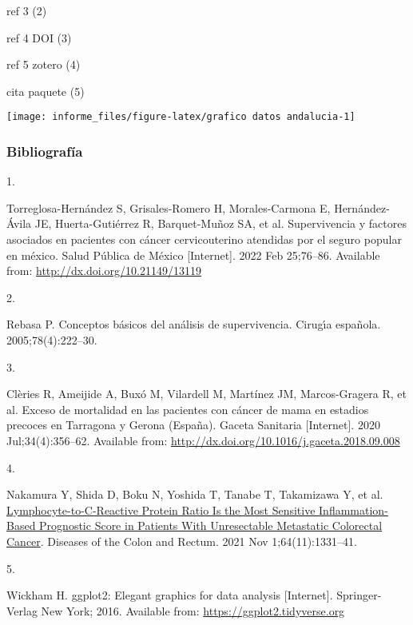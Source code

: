 \documentclass[
]{article}
\newlength{\cslhangindent}
\newlength{\csllabelwidth}
\newlength{\cslentryspacingunit} %
\newenvironment{CSLReferences}[2] %
 {%
  \setlength{\parindent}{0pt}
  \ifodd #1
  \let\oldpar\par
  \def\par{\hangindent=\cslhangindent\oldpar}
  \fi
  \setlength{\parskip}{#2\cslentryspacingunit}
 }%
 {}
\newcommand{\CSLLeftMargin}[1]{\parbox[t]{\csllabelwidth}{#1}}
\newcommand{\CSLRightInline}[1]{\parbox[t]{\linewidth - \csllabelwidth}{#1}\break}
\begin{document}
ref 3 (2)

ref 4 DOI (3)

ref 5 zotero (4)

cita paquete (5)

\begin{center}\texttt{[image: informe\_files/figure-latex/grafico datos andalucia-1]} \end{center}

\hypertarget{bibliografuxeda}{%
\subsubsection*{Bibliografía}\label{bibliografuxeda}}

\hypertarget{refs}{}
\begin{CSLReferences}{0}{0}
\leavevmode{}%
\CSLLeftMargin{1. }
\CSLRightInline{Torreglosa-Hernández S, Grisales-Romero H,
Morales-Carmona E, Hernández-Ávila JE, Huerta-Gutiérrez R, Barquet-Muñoz
SA, et al. Supervivencia y factores asociados en pacientes con cáncer
cervicouterino atendidas por el seguro popular en méxico. Salud Pública
de México {[}Internet{]}. 2022 Feb 25;76--86. Available from:
\url{http://dx.doi.org/10.21149/13119}}

\leavevmode{}%
\CSLLeftMargin{2. }
\CSLRightInline{Rebasa P. Conceptos b{á}sicos del an{á}lisis de
supervivencia. Cirug{ı́}a espa{ñ}ola. 2005;78(4):222--30. }

\leavevmode{}%
\CSLLeftMargin{3. }
\CSLRightInline{Clèries R, Ameijide A, Buxó M, Vilardell M, Martínez JM,
Marcos-Gragera R, et al. Exceso de mortalidad en las pacientes con
cáncer de mama en estadios precoces en Tarragona y Gerona (España).
Gaceta Sanitaria {[}Internet{]}. 2020 Jul;34(4):356--62. Available from:
\url{http://dx.doi.org/10.1016/j.gaceta.2018.09.008}}

\leavevmode{}%
\CSLLeftMargin{4. }
\CSLRightInline{Nakamura Y, Shida D, Boku N, Yoshida T, Tanabe T,
Takamizawa Y, et al.
\href{https://doi.org/10.1097/DCR.0000000000002059}{Lymphocyte-to-C-Reactive
Protein Ratio Is the Most Sensitive Inflammation-Based Prognostic Score
in Patients With Unresectable Metastatic Colorectal Cancer}. Diseases of
the Colon and Rectum. 2021 Nov 1;64(11):1331--41. }

\leavevmode{}%
\CSLLeftMargin{5. }
\CSLRightInline{Wickham H. ggplot2: Elegant graphics for data analysis
{[}Internet{]}. Springer-Verlag New York; 2016. Available from:
\url{https://ggplot2.tidyverse.org}}

\end{CSLReferences}
\end{document}
